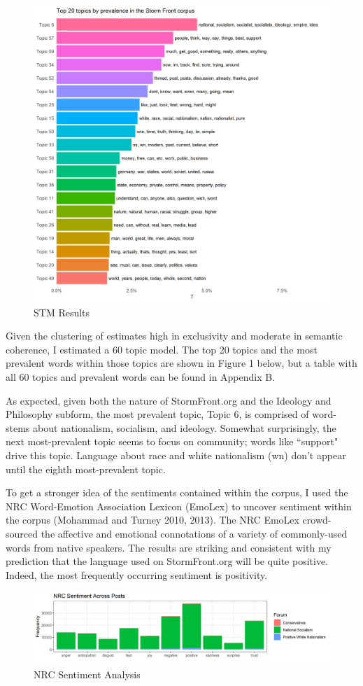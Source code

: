 \documentclass[12pt]{paper}
\begin{document}
\begin{figure} \centering
	\includegraphics[width=.8\linewidth]{figs/top-20.png}
	\caption{STM Results}
	\label{}
\end{figure}

Given the clustering of estimates high in exclusivity and moderate in semantic coherence, I estimated a 60 topic model. The top 20 topics and the most prevalent words within those topics are shown in Figure 1 below, but a table with all 60 topics and prevalent words can be found in Appendix B.

As expected, given both the nature of StormFront.org and the Ideology and Philosophy subform, the most prevalent topic, Topic 6, is comprised of word-stems about nationalism, socialism, and ideology. Somewhat surprisingly, the next most-prevalent topic seems to focus on community; words like ``support" drive this topic. Language about race and white nationalism (wn) don't appear until the eighth most-prevalent topic.

To get a stronger idea of the sentiments contained within the corpus, I used the NRC Word-Emotion Association Lexicon (EmoLex) to uncover sentiment within the corpus (Mohammad and Turney 2010, 2013). The NRC EmoLex crowd-sourced the affective and emotional connotations of a variety of commonly-used words from native speakers. The results are striking and consistent with my prediction that the language used on StormFront.org will be quite positive. Indeed, the most frequently occurring sentiment is positivity.

\begin{figure} \centering
	\includegraphics[width=.8\linewidth]{figs/sentiment_freq_all_words.png}
	\caption{NRC Sentiment Analysis}
	\label{}
\end{figure}
\end{document}
